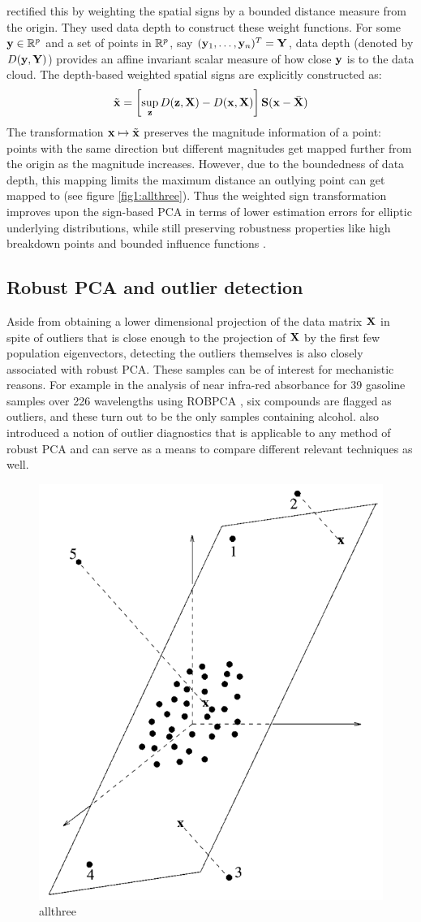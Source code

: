 \cite{Majumdar15} rectified this by weighting the spatial signs by a bounded distance measure from the origin. They used data depth \citep{zuo00} to construct these weight functions. For some ${\bf{y}} \in {\mathbb{R}}^p$ and a set of points in ${\mathbb{R}}^p$, say $({\bf{y}}_1, \ldots, {\bf{y}}_n)^T = {\mathbf{Y}}$, data depth (denoted by $D({\bf{y}}, {\mathbf{Y}})$) provides an affine invariant scalar measure of how close ${\bf{y}}$ is to the data cloud. The depth-based weighted spatial signs\cite{Majumdar15} are explicitly constructed as:
%
\begin{align}
\tilde {{\bf{x}}} = \left[ \sup_{{\bf{z}}} D({\bf{z}}, {\mathbf{X}}) - D({\bf{x}}, {\mathbf{X}}) \right] {\mathbf{S}}( {\bf{x}} - \bar {{\mathbf{X}}} )
\end{align}
%
The transformation ${\bf{x}} \mapsto \tilde {{\bf{x}}}$ preserves the magnitude information of a point: points with the same direction but different magnitudes get mapped further from the origin as the magnitude increases. However, due to the boundedness of data depth, this mapping limits the maximum distance an outlying point can get mapped to (see figure \ref{fig1:allthree}). Thus the weighted sign transformation improves upon the sign-based PCA in terms of lower estimation errors for elliptic underlying distributions, while still preserving robustness properties like high breakdown points and bounded influence functions \citep{Majumdar15}.

\subsection{Robust PCA and outlier detection}
Aside from obtaining a lower dimensional projection of the data matrix ${\mathbf{X}}$ in spite of outliers that is close enough to the projection of ${\mathbf{X}}$ by the first few population eigenvectors, detecting the outliers themselves is also closely associated with robust PCA. These samples can be of interest for mechanistic reasons. For example in the analysis of near infra-red absorbance for 39 gasoline samples over 226 wavelengths using ROBPCA \citep{hubert05}, six compounds are flagged as outliers, and these turn out to be the only samples containing alcohol. \cite{hubert05} also introduced a notion of outlier diagnostics that is applicable to any method of robust PCA and can serve as a means to compare different relevant techniques as well.

\begin{figure}[t]
\centering
\includegraphics[width=.33\textwidth]{ROBPCA_plot}
\caption{allthree}
\label{fig:figROBPCA}
\end{figure}

